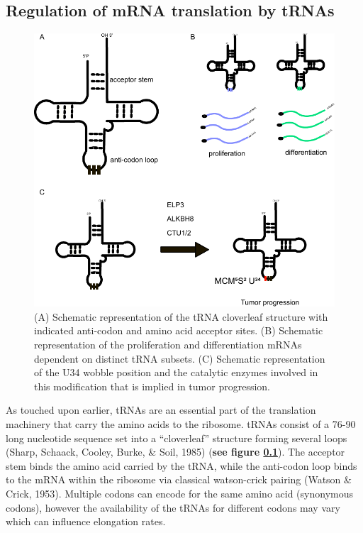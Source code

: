 \documentclass[12pt,openany]{book}
\begin{document}
\subsection{Regulation of mRNA translation by tRNAs} \label{tRNA}

\begin{figure}
  \includegraphics{./figures/tRNA.pdf}
  \caption{ (A) Schematic representation of the tRNA cloverleaf structure with indicated anti-codon and amino acid acceptor sites.  (B) Schematic representation of the proliferation and differentiation mRNAs dependent on distinct tRNA subsets. (C) Schematic representation of the U34 wobble position and the catalytic enzymes involved in this modification that is implied in tumor progression.
 \label{fig:tRNA}}
\end{figure}

As touched upon earlier, tRNAs are an essential part of the translation
machinery that carry the amino acids to the ribosome. tRNAs consist of a
76-90 long nucleotide sequence set into a ``cloverleaf'' structure
forming several loops (Sharp, Schaack, Cooley, Burke, \& Soil, 1985)
(\textbf{see figure \ref{tRNA}}). The acceptor stem binds the amino acid
carried by the tRNA, while the anti-codon loop binds to the mRNA within
the ribosome via classical watson-crick pairing (Watson \& Crick, 1953).
Multiple codons can encode for the same amino acid (synonymous codons),
however the availability of the tRNAs for different codons may vary
which can influence elongation rates.
\end{document}
